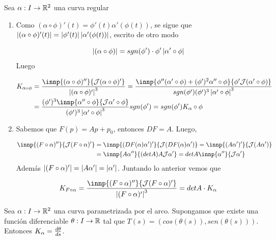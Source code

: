 \documentclass{article}
\begin{document}
\begin{dem} Sea $\alpha: I\to\mathbb{R}^{2}$ una curva regular
    \begin{enumerate}
        \item Como $(\alpha\circ\phi)'(t)=\phi'(t)\alpha'(\phi(t))$, se sigue que 
        $\left|(\alpha\circ\phi)'(t) \right|=\left|\phi'(t) \right|\left|\alpha'(\phi(t)) \right|$, escrito de otro modo
        
        \begin{equation*}
            \left|(\alpha\circ\phi) \right|=sgn(\phi')\cdot\phi'\left|\alpha'\circ\phi \right|
        \end{equation*}
        Luego

        \begin{align*}
            K_{\alpha\circ\phi} &= \frac{\innp{(\alpha\circ\phi)''}{\J(\alpha\circ\phi)'}}
            {\abs{(\alpha\circ\phi)'}^{3}}=
            \frac{\innp{\phi''(\alpha'\circ\phi)+(\phi')^{2}\alpha''\circ\phi}
            {\phi'\J(\alpha'\circ\phi)}}{sgn(\phi')(\phi')^{3}\abs{\alpha'\circ\phi}^{3}} \\
            &= \frac{(\phi')^{3}\innp{\alpha''\circ\phi}{\J\alpha'\circ\phi}}
            {(\phi')^{3}\abs{\alpha'\circ\phi}^{3}}sgn(\phi')=sgn(\phi')K_{\alpha}\circ\phi
        \end{align*}
        
        \item Sabemos que $F(p)=Ap+p_{0}$, entonces $DF=A$. Luego,
        
        \begin{align*}
            \innp{(F\circ\alpha)''}{\J(F\circ\alpha)'} &= \innp{(DF(\alpha)\alpha')'}
            {\J(DF(\alpha)\alpha')}=\innp{(A\alpha')'}{\J(A\alpha')} \\
            &= \innp{A\alpha''}{(detA)A\J\alpha'}=detA\innp{\alpha''}{\J\alpha'}
        \end{align*}
        Además $\left|(F\circ\alpha)' \right|=\left|A\alpha' \right|=\left|\alpha' \right|$. Juntando lo anterior vemos que

        \begin{equation*}
            K_{F\circ\alpha}=\frac{\innp{(F\circ\alpha)''}{\J(F\circ\alpha)'}}
            {\abs{(F\circ\alpha)'}^{3}} = detA\cdot K_{\alpha}
        \end{equation*}
    \end{enumerate}
\end{dem}

\begin{prop}
    Sea $\alpha: I\to\mathbb{R}^{2}$ una curva parametrizada por el arco. Supongamos que existe una función
    diferenciable $\theta: I\to\mathbb{R}$ tal que $T(s)=(cos(\theta(s)),sen(\theta(s)))$. Entonces 
    $K_{\alpha}=\frac{d\theta}{ds}$.
\end{prop}
\end{document}
